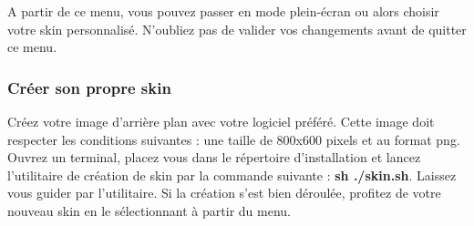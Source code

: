 A partir de ce menu, vous pouvez passer en mode plein-écran ou alors choisir votre skin personnalisé.
N'oubliez pas de valider vos changements avant de quitter ce menu.

\subsubsection{Créer son propre skin}
	
	Créez votre image d'arrière plan avec votre logiciel préféré. Cette image doit respecter les conditions suivantes : une taille de 800x600 pixels et au format png.\\
	
	Ouvrez un terminal, placez vous dans le répertoire d'installation et lancez l'utilitaire de création de skin par la commande suivante : \textbf{sh ./skin.sh}. Laissez vous guider par l'utilitaire. Si la création s'est bien déroulée, profitez de votre nouveau skin en le sélectionnant à partir du menu.